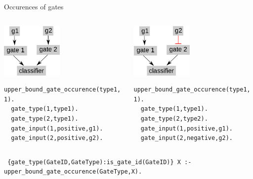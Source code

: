 \documentclass[10pt,dvipsnames]{beamer}
\begin{document}
\begin{frame}[fragile]{Occurences of gates}
 \begin{columns}  
 \begin{column}{0.6\textwidth}
 \begin{center}\includegraphics[width=3cm]{constraints_05.png}\end{center}
 \color{my_example_color}
  \begin{Verbatim}[fontsize=\small]
  upper_bound_gate_occurence(type1, 1).
  gate_type(1,type1).
  gate_type(2,type1).
  gate_input(1,positive,g1).
  gate_input(2,positive,g2).
 \end{Verbatim}
 \end{column}
 \begin{column}{0.6\textwidth}
 \begin{center}\includegraphics[width=3cm]{constraints_06.png}\end{center}
 \color{my_example_color}
  \begin{Verbatim}[fontsize=\small]
  upper_bound_gate_occurence(type1, 1).
  gate_type(1,type1).
  gate_type(2,type2).
  gate_input(1,positive,g1).
  gate_input(2,negative,g2).
 \end{Verbatim}
 \end{column}
 \end{columns}
 \vspace{1cm}
 \texttt{
  \{gate\_type(GateID,GateType):{\color{gray}\;is\_gate\_id(GateID)}\} X :-\\
     \quad upper\_bound\_gate\_occurence(GateType,X).
 }
\end{frame}
 
\end{document}
